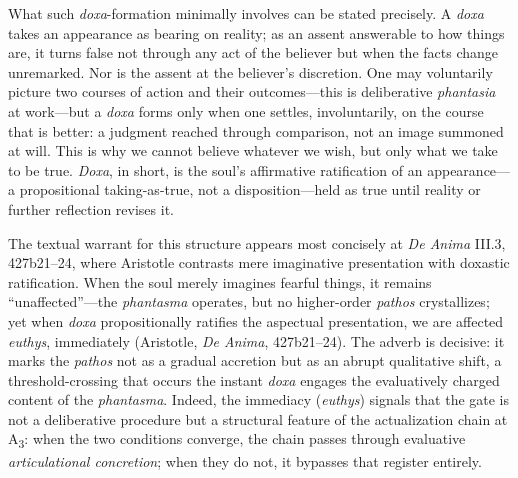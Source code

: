 \documentclass{article}
\begin{document}
What such \textit{doxa}-formation minimally involves can be stated precisely. A \textit{doxa} takes an appearance as bearing on reality; as an assent answerable to how things are, it turns false not through any act of the believer but when the facts change unremarked. Nor is the assent at the believer's discretion. One may voluntarily picture two courses of action and their outcomes---this is deliberative \textit{phantasia} at work---but a \textit{doxa} forms only when one settles, involuntarily, on the course that is better: a judgment reached through comparison, not an image summoned at will. This is why we cannot believe whatever we wish, but only what we take to be true. \textit{Doxa}, in short, is the soul's affirmative ratification of an appearance---a propositional taking-as-true, not a disposition---held as true until reality or further reflection revises it.

The textual warrant for this structure appears most concisely at \textit{De Anima} III.3, 427b21--24, where Aristotle contrasts mere imaginative presentation with doxastic ratification. When the soul merely imagines fearful things, it remains ``unaffected''---the \textit{phantasma} operates, but no higher-order \textit{pathos} crystallizes; yet when \textit{doxa} propositionally ratifies the aspectual presentation, we are affected \textit{euthys}, immediately (Aristotle, \textit{De Anima}, 427b21--24). The adverb is decisive: it marks the \textit{pathos} not as a gradual accretion but as an abrupt qualitative shift, a threshold-crossing that occurs the instant \textit{doxa} engages the evaluatively charged content of the \textit{phantasma}. Indeed, the immediacy (\textit{euthys}) signals that the gate is not a deliberative procedure but a structural feature of the actualization chain at A\textsubscript{3}: when the two conditions converge, the chain passes through evaluative \textit{articulational concretion}; when they do not, it bypasses that register entirely.
\end{document}
